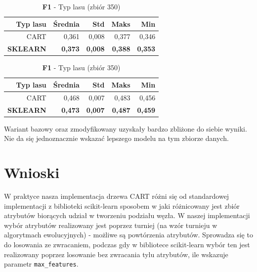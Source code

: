 \documentclass[a4paper]{article}
\begin{document}
\begin{table}[htbp]
        \begin{minipage}[t]{0.48\textwidth}
            \centering
            \caption{\textbf{Czułość} - Typ lasu (zbiór 350)}
            \label{tab:Compare_on_350_rec}
            \begin{tabular}{r|r|r|r|r}
                \toprule
                Typ lasu & Średnia & Std & Maks & Min \\
                \hline
                CART & 0,361 & 0,008 & 0,377 & 0,346 \\
                \textbf{SKLEARN} & \textbf{0,373} & \textbf{0,008} & \textbf{0,388} & \textbf{0,353} \\
                \bottomrule
            \end{tabular}
        \end{minipage}
        \hfill
        \begin{minipage}[t]{0.48\textwidth}
            \centering
            \caption{\textbf{F1} - Typ lasu (zbiór 350)}
            \label{tab:Compare_on_350_f1}
            \begin{tabular}{r|r|r|r|r}
                \toprule
                Typ lasu & Średnia & Std & Maks & Min \\
                \hline
                CART & 0,468 & 0,007 & 0,483 & 0,456 \\
                \textbf{SKLEARN} & \textbf{0,473} & \textbf{0,007} & \textbf{0,487} & \textbf{0,459} \\
                \bottomrule
            \end{tabular}
        \end{minipage}
    \end{table}

    Wariant bazowy oraz zmodyfikowany uzyskały bardzo zbliżone do siebie wyniki.
    Nie da się jednoznacznie wskazać lepszego modelu na tym zbiorze danych.

\section{Wnioski}

W praktyce nasza implementacja drzewa CART różni się od standardowej implementacji z biblioteki scikit-learn sposobem w jaki różnicowany jest zbiór atrybutów biorących udział w tworzeniu podziału węzła.
W naszej implementacji wybór atrybutów realizowany jest poprzez turniej (na wzór turnieju w algorytmach ewolucyjnych) - możliwe są powtórzenia atrybutów. Sprowadza się to do losowania ze zwracaniem,
podczas gdy w bibliotece scikit-learn wybór ten jest realizowany poprzez losowanie bez zwracania tylu atrybutów, ile wskazuje parametr \texttt{max\_features}.
\end{document}
